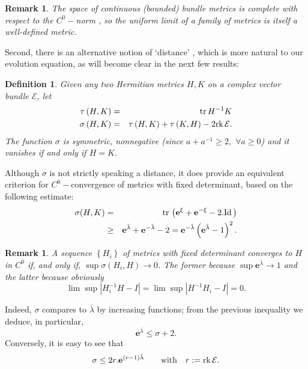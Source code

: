\documentclass{article}
\newcommand{\func}[1]{\textnormal {#1\,}}
\newcommand{\e}[1]{\mathbf{e}^{#1}}
\newtheorem{definition}[theorem]{Definition}
\newtheorem{remark}[theorem]{Remark}
\begin{document}
\begin{remark}       \label{Rem Co norm is complete}
The space of continuous (bounded) bundle
metrics is \emph{complete} with respect to the $C^{0}-$norm \cite[Theorem
7.15]{Rudin}, so  the uniform limit of a family of metrics is itself a well-defined metric.
\end{remark}

Second, there is an alternative notion of `distance' \cite[Definition 12]{ASDYM},
which is more natural to our evolution equation, as will become clear in the next few results:
\begin{definition}
Given any two Hermitian metrics $H,K$ on a complex vector bundle $\mathcal{E}$,
let%
\begin{eqnarray*}       \index{distance}%
        \tau \left( H,K\right)   &=& \func{tr}H^{-1}K \\
        \sigma \left( H,K\right) &=&\tau \left( H,K\right) +\tau \left( K,H\right)
        -2\func{rk}\mathcal{E}.
\end{eqnarray*}%
The function $\sigma $ is symmetric, nonnegative (since $a+a^{-1}\geq 2,$ $\forall
a\geq 0$) and it vanishes if and only if $H=K$.
\end{definition}

Although $\sigma $ is not strictly speaking a distance, it does provide an equivalent criterion for $C^0-$convergence of metrics with fixed determinant, based on the following estimate:%
\begin{eqnarray*}
        \sigma(H,K) &=&\func{tr}\left( \e{\xi }+\e{-\xi }-2.\func{Id}\right) \\
        &\geq &\e{\bar{\lambda}}+\e{-\bar{\lambda}}-2
        =\e{-\bar{\lambda}}\left( \e{\bar{\lambda}}-1\right) ^{2}.
\end{eqnarray*}
\begin{remark}        \label{Rem conv sigma => conv lambda} 
A sequence $\left\{H_{i}\right\} $ of metrics with fixed determinant converges to $H$ in $C^{0}$ if, and only if, $\sup \sigma\left( H_{i},H\right) \rightarrow 0$. The former because $\sup \e{\bar{\lambda}}\rightarrow 1$ and the latter because obviously $$\lim\sup \left\vert H_i^{-1}H-I\right\vert=\lim \sup \left\vert H^{-1}H_i-I\right\vert=0.$$
\end{remark}
Indeed, $\sigma$ compares
to $\bar{\lambda}$ by increasing functions; from the previous inequality we deduce, in particular,
\begin{equation}        \label{eq sigma bounds lambda}
        \e{\bar{\lambda}}\leq \sigma +2.
\end{equation}%
Conversely, it is easy to see that%
\begin{equation*}
        \sigma \leq 2r.\e{\left( r-1\right) \bar{\lambda}}
        \qquad\text{with}\quad  r:=\func{rk}\mathcal{E}.
\end{equation*}%
\end{document}
